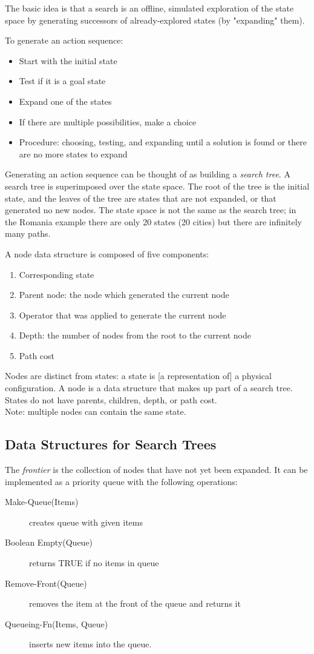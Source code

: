 The basic idea is that a search is an offline, simulated exploration of the
state space by generating successors of already-explored states (by "expanding"
them).

To generate an action sequence:
\begin{itemize}
    \item Start with the initial state
    \item Test if it is a goal state
    \item Expand one of the states
    \item If there are multiple possibilities, make a choice
    \item Procedure: choosing, testing, and expanding until a solution is found
    or there are no more states to expand
\end{itemize}

Generating an action sequence can be thought of as building a \textit{search
tree}. A search tree is superimposed over the state space. The root of the tree
is the initial state, and the leaves of the tree are states that are not
expanded, or that generated no new nodes. The state space is not the same as
the search tree; in the Romania example there are only 20 states (20 cities)
but there are infinitely many paths.

A node data structure is composed of five components:
\begin{enumerate}
    \item Corresponding state
    \item Parent node: the node which generated the current node
    \item Operator that was applied to generate the current node
    \item Depth: the number of nodes from the root to the current node
    \item Path cost
\end{enumerate}

Nodes are distinct from states: a state is [a representation of] a physical
configuration. A node is a data structure that makes up part of a search tree.
States do not have parents, children, depth, or path cost.\\
Note: multiple nodes can contain the same state.

\subsection{Data Structures for Search Trees}
The \textit{frontier} is the collection of nodes that have not yet been
expanded. It can be implemented as a priority queue with the following
operations:
\begin{description}
    \item[Make-Queue(Items)] creates queue with given items
    \item[Boolean Empty(Queue)] returns TRUE if no items in queue
    \item[Remove-Front(Queue)] removes the item at the front of the queue and
    returns it
    \item[Queueing-Fn(Items, Queue)] inserts new items into the queue.
\end{description}

